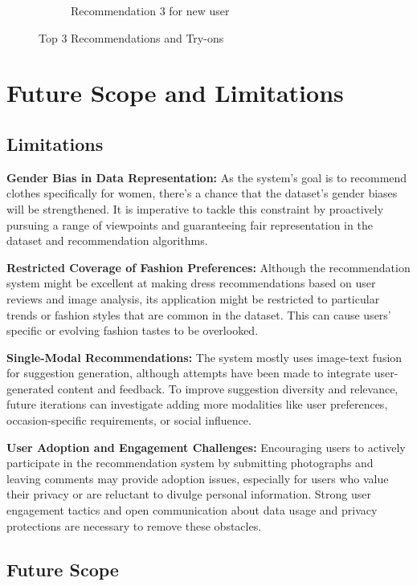 \documentclass[conference]{IEEEtran}
\begin{document}
\begin{figure}[!htbp]
\begin{subfigure}[b]{0.5\textwidth}
    \caption{Recommendation 3 for new user}
    \label{fig:Recommendations3}
  \end{subfigure}  
  \caption{Top 3 Recommendations and Try-ons}
  \label{fig:AllRecommendations}
\end{figure}


\section{Future Scope and Limitations}
\subsection{Limitations}
\textbf{Gender Bias in Data Representation:} As the system's goal is to recommend clothes specifically for women, there's a chance that the dataset's gender biases will be strengthened. It is imperative to tackle this constraint by proactively pursuing a range of viewpoints and guaranteeing fair representation in the dataset and recommendation algorithms.

\textbf{Restricted Coverage of Fashion Preferences:} Although the recommendation system might be excellent at making dress recommendations based on user reviews and image analysis, its application might be restricted to particular trends or fashion styles that are common in the dataset. This can cause users' specific or evolving fashion tastes to be overlooked.

\textbf{Single-Modal Recommendations:} The system mostly uses image-text fusion for suggestion generation, although attempts have been made to integrate user-generated content and feedback. To improve suggestion diversity and relevance, future iterations can investigate adding more modalities like user preferences, occasion-specific requirements, or social influence.

\textbf{User Adoption and Engagement Challenges:} Encouraging users to actively participate in the recommendation system by submitting photographs and leaving comments may provide adoption issues, especially for users who value their privacy or are reluctant to divulge personal information. Strong user engagement tactics and open communication about data usage and privacy protections are necessary to remove these obstacles.

\subsection{Future Scope}
\end{document}

